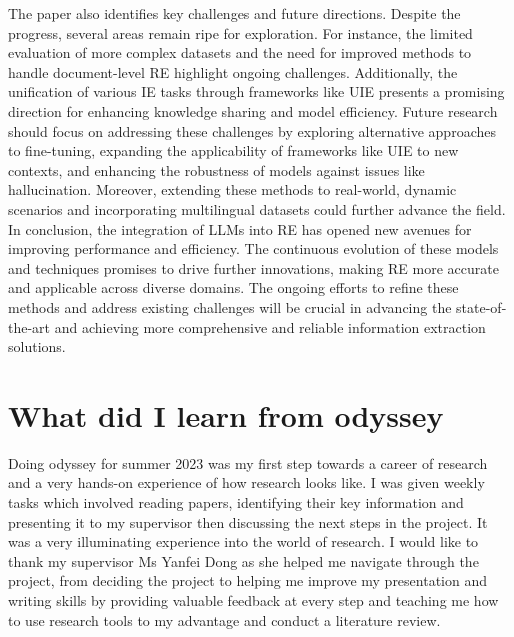 \documentclass[twocolumn, 11pt]{extarticle}
\begin{document}
The paper also identifies key challenges and future directions. Despite the progress, several areas remain ripe for exploration. For instance, the limited evaluation of more complex datasets and the need for improved methods to handle document-level RE highlight ongoing challenges. Additionally, the unification of various IE tasks through frameworks like UIE presents a promising direction for enhancing knowledge sharing and model efficiency.
Future research should focus on addressing these challenges by exploring alternative approaches to fine-tuning, expanding the applicability of frameworks like UIE to new contexts, and enhancing the robustness of models against issues like hallucination. Moreover, extending these methods to real-world, dynamic scenarios and incorporating multilingual datasets could further advance the field. 
In conclusion, the integration of LLMs into RE has opened new avenues for improving performance and efficiency. The continuous evolution of these models and techniques promises to drive further innovations, making RE more accurate and applicable across diverse domains. The ongoing efforts to refine these methods and address existing challenges will be crucial in advancing the state-of-the-art and achieving more comprehensive and reliable information extraction solutions.


\section{What did I learn from odyssey}
Doing odyssey for summer 2023 was my first step towards a career of research and a very hands-on experience of how research looks like. I was given weekly tasks which involved reading papers, identifying their key information and presenting it to my supervisor then discussing the next steps in the project. It was a very illuminating experience into the world of research. I would like to thank my supervisor Ms Yanfei Dong as she helped me navigate through the project, from deciding the project to helping me improve my presentation and writing skills by providing valuable feedback at every step and teaching me how to use research tools to my advantage and conduct a literature review.

\newpage



\cite{*}
\end{document}
